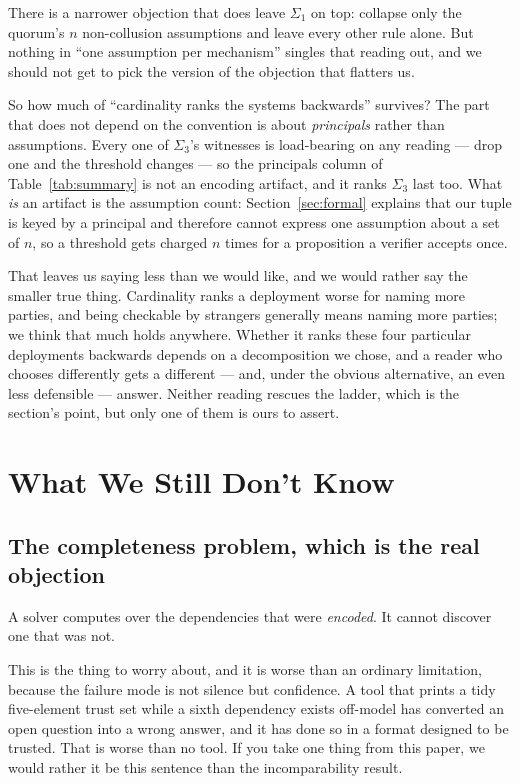 \documentclass[11pt]{article}
\begin{document}
There is a narrower objection that does leave $\Sigma_1$ on top: collapse
only the quorum's $n$ non-collusion assumptions and leave every other rule
alone. But nothing in ``one assumption per mechanism'' singles that reading
out, and we should not get to pick the version of the objection that
flatters us.

So how much of ``cardinality ranks the systems backwards'' survives? The part
that does not depend on the convention is about \emph{principals} rather than
assumptions. Every one of $\Sigma_3$'s witnesses is load-bearing on any
reading --- drop one and the threshold changes --- so the principals column
of Table~\ref{tab:summary} is not an encoding artifact, and it ranks
$\Sigma_3$ last too. What \emph{is} an artifact is the assumption count:
Section~\ref{sec:formal} explains that our tuple is keyed by a principal and
therefore cannot express one assumption about a set of $n$, so a threshold
gets charged $n$ times for a proposition a verifier accepts once.

That leaves us saying less than we would like, and we would rather say the
smaller true thing. Cardinality ranks a deployment worse for naming more
parties, and being checkable by strangers generally means naming more
parties; we think that much holds anywhere. Whether it ranks these four
particular deployments backwards depends on a decomposition we chose, and a
reader who chooses differently gets a different --- and, under the obvious
alternative, an even less defensible --- answer. Neither reading rescues the
ladder, which is the section's point, but only one of them is ours to
assert.

\section{What We Still Don't Know}
\label{sec:open}

\subsection{The completeness problem, which is the real objection}

A solver computes over the dependencies that were \emph{encoded}. It cannot
discover one that was not.

This is the thing to worry about, and it is worse than an ordinary
limitation, because the failure mode is not silence but confidence. A tool
that prints a tidy five-element trust set while a sixth dependency exists
off-model has converted an open question into a wrong answer, and it has done
so in a format designed to be trusted. That is worse than no tool. If you
take one thing from this paper, we would rather it be this sentence than the
incomparability result.
\end{document}
